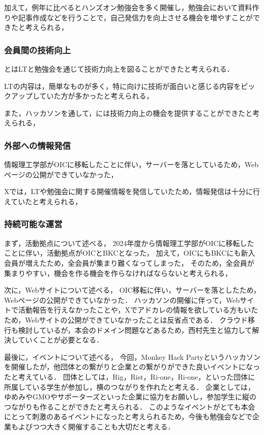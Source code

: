 加えて，例年に比べるとハンズオン勉強会を多く開催し，勉強会において資料作りや記事作成などを行うことで，自己発信力を向上させる機会を増やすことができたと考えられる，

\subsubsection*{会員間の技術向上}
\secondGrade{}と\thirdGrade{}はLTと勉強会を通じて技術力向上を図ることができたと考えられる．

LTの内容は，簡単なものが多く，特に\firstGrade{}向けに技術が面白いと感じる内容をピックアップしていた方が多かったと考えられる，

また，ハッカソンを通して，\firstGrade{}には技術力向上の機会を提供することができたと考えられる，

\subsubsection*{外部への情報発信}
情報理工学部がOICに移転したことに伴い，サーバーを落としているため，Webページの公開ができていなかった，

Xでは，LTや勉強会に関する開催情報を発信していたため，情報発信は十分に行えていたと考えられる，

\subsubsection*{持続可能な運営}

まず，活動拠点について述べる，
2024年度から情報理工学部がOICに移転したことに伴い，活動拠点がOICとBKCとなった，
加えて，OICにもBKCにも新入会員が増えたため，全会員が集まり難くなってしまった，
そのため，全会員が集まりやすい，機会を作る機会を作らなければならないと考えられる，

次に，Webサイトについて述べる，
OIC移転に伴い，サーバーを落としたため，Webページの公開ができていなかった．
ハッカソンの開催に伴って，Webサイトで活動報告を行えなかったことや，Xでアドカレの情報を欲している方もいたため，Webサイトの公開ができていなかったことは反省点である．
クラウド移行も検討しているが，本会のドメイン問題などあるため，西村先生と協力して解決していくことが必要となる．

最後に，イベントについて述べる，
今回，Monkey Hack Partyというハッカソンを開催したが，他団体との繋がりと企業との繋がりができた良いイベントになったと考えている．
団体としては，Rig，Rist，Ri-one，Ri-one，といった団体に所属している学生が参加し，横のつながりを作れたと考える．
企業としては，ゆめみやGMOやサポーターズといった企業に協力をお願いし，参加学生に縦のつながりも作ることができたと考えられる．
このようなイベントがとても本会にとって刺激のあるイベントになったと考えられるため，今後も勉強会などで企業もよびつつ大きく開催することも大切だと考える．



